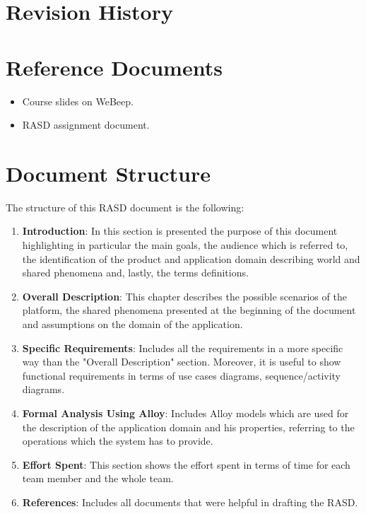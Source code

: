 \section{Revision History}

\section{Reference Documents}
\begin{itemize}
    \item Course slides on WeBeep. 
    \item RASD assignment document.
\end{itemize}


\section{Document Structure}
The structure of this RASD document is the following:
\begin{enumerate}
    \item \textbf{Introduction}: In this section is presented the purpose of this document highlighting in particular the main goals, the audience which is referred to, the identification of the product and application domain  describing world and shared phenomena and, lastly, the terms definitions.
    \item \textbf{Overall Description}: This chapter describes the possible scenarios of the platform, the shared phenomena presented at the beginning of the document and assumptions on the domain of the application.
    \item \textbf{Specific Requirements}: Includes all the requirements in a more specific way than the "Overall Description" section. Moreover, it is useful to show functional requirements in terms of use cases diagrams, sequence/activity diagrams.
    \item \textbf{Formal Analysis Using Alloy}: Includes Alloy models which are used for the description of the application domain and his properties, referring to the operations which the system has to provide.
    \item \textbf{Effort Spent}: This section shows the effort spent in terms of time for each team member and the whole team.
    \item \textbf{References}: Includes all documents that were helpful in drafting the RASD.
\end{enumerate}